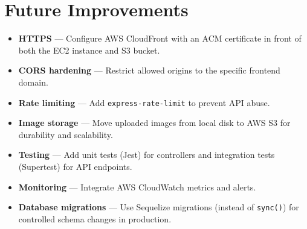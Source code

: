 \documentclass[12pt,a4paper]{report}
\begin{document}
\section{Future Improvements}

\begin{itemize}[leftmargin=2em]
  \item \textbf{HTTPS} — Configure AWS CloudFront with an ACM certificate in front of both the EC2 instance and S3 bucket.
  \item \textbf{CORS hardening} — Restrict allowed origins to the specific frontend domain.
  \item \textbf{Rate limiting} — Add \texttt{express-rate-limit} to prevent API abuse.
  \item \textbf{Image storage} — Move uploaded images from local disk to AWS S3 for durability and scalability.
  \item \textbf{Testing} — Add unit tests (Jest) for controllers and integration tests (Supertest) for API endpoints.
  \item \textbf{Monitoring} — Integrate AWS CloudWatch metrics and alerts.
  \item \textbf{Database migrations} — Use Sequelize migrations (instead of \texttt{sync()}) for controlled schema changes in production.
\end{itemize}
\end{document}
